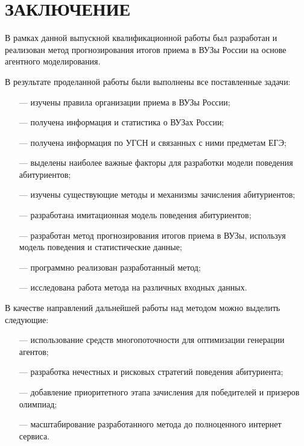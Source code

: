 \section*{ЗАКЛЮЧЕНИЕ}

В рамках данной выпускной квалификационной работы был разработан и
реализован  метод прогнозирования итогов приема в ВУЗы России на основе агентного моделирования.

В результате проделанной работы были выполнены все поставленные задачи:

\begin{itemize}[leftmargin=1.6\parindent]
	\item[---] изучены правила организации приема в ВУЗы России;
	\item[---] получена информация и статистика о ВУЗах России;
	\item[---] получена информация по УГСН и связанных с ними предметам ЕГЭ;
	\item[---] выделены наиболее важные факторы для разработки модели поведения абитуриентов;
	\item[---] изучены существующие методы и механизмы зачисления абитуриентов;
	\item[---] разработана имитационная модель поведения абитуриентов;
	\item[---] разработан метод прогнозирования итогов приема в ВУЗы, используя модель поведения и статистические данные;
	\item[---] программно реализован разработанный метод;
	\item[---] исследована работа метода на различных входных данных.
\end{itemize}


В качестве направлений дальнейшей работы над методом можно выделить следующие:

\begin{itemize}[leftmargin=1.6\parindent]
	\item[---] использование средств многопоточности для оптимизации генерации агентов;
	\item[---] разработка нечестных и рисковых стратегий поведения абитуриента;
	\item[---] добавление приоритетного этапа зачисления для победителей и призеров олимпиад;
	\item[---] масштабирование разработанного метода до полноценного интернет сервиса.
\end{itemize}

\pagebreak